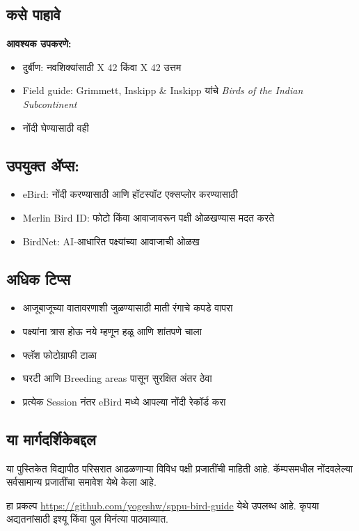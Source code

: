 \documentclass[a4paper,12pt,landscape]{memoir}
\newcommand{\introsection}[2]{%
  \begin{minipage}[t]{0.48\textwidth}
    \begin{mdframed}[
      linecolor=headingcolor,
      linewidth=1pt,
      roundcorner=5pt,
      leftmargin=0pt,
      rightmargin=0pt,
      backgroundcolor=headingcolor!5
    ]
      #1
    \end{mdframed}
  \end{minipage}\hfill
  \begin{minipage}[t]{0.48\textwidth}
    \begin{mdframed}[
      linecolor=headingcolor,
      linewidth=1pt,
      roundcorner=5pt,
      leftmargin=0pt,
      rightmargin=0pt,
      backgroundcolor=headingcolor!5
    ]
      #2
    \end{mdframed}
  \end{minipage}
  \newpage
}
\begin{document}
\introsection{%
  \section*{\textbf{कसे पाहावे}}
  \textbf{आवश्यक उपकरणे:}
  \begin{itemize}
  \item दुर्बीण: नवशिक्यांसाठी {\latintext 8 X 42} किंवा {\latintext 10 X 42} उत्तम
  \item {\latintext Field guide: Grimmett, Inskipp \& Inskipp} यांचे {\latintext \textit{Birds of the Indian Subcontinent}}
  \item नोंदी घेण्यासाठी वही
  \end{itemize}
}{%
  \section*{\textbf{उपयुक्त ॲप्स:}}
  \begin{itemize}
  \item {\latintext eBird}: नोंदी करण्यासाठी आणि हॉटस्पॉट एक्सप्लोर करण्यासाठी
  \item {\latintext Merlin Bird ID}: फोटो किंवा आवाजावरून पक्षी ओळखण्यास मदत करते
  \item {\latintext BirdNet}: {\latintext AI}-आधारित पक्ष्यांच्या आवाजाची ओळख
  \end{itemize}
}

\introsection{%
  \section*{\textbf{अधिक टिप्स}}
  \begin{itemize}
  \item आजूबाजूच्या वातावरणाशी जुळण्यासाठी माती रंगाचे कपडे वापरा
  \item पक्ष्यांना त्रास होऊ नये म्हणून हळू आणि शांतपणे चाला
  \item फ्लॅश फोटोग्राफी टाळा
  \item घरटी आणि {\latintext Breeding areas} पासून सुरक्षित अंतर ठेवा
  \item प्रत्येक {\latintext Session} नंतर {\latintext eBird} मध्ये आपल्या नोंदी रेकॉर्ड करा
  \end{itemize}
}{%
  \section*{\textbf{या मार्गदर्शिकेबद्दल}}
  या पुस्तिकेत विद्यापीठ परिसरात आढळणाऱ्या विविध पक्षी प्रजातींची माहिती आहे. कॅम्पसमधील नोंदवलेल्या सर्वसामान्य प्रजातींचा समावेश येथे केला आहे.
  \par\medskip
  हा प्रकल्प  {\latintext\href{https://github.com/yogeshw/sppu-bird-guide}{https://github.com/yogeshw/sppu-bird-guide}} येथे उपलब्ध आहे. कृपया अद्यतनांसाठी इश्यू किंवा पुल विनंत्या पाठवाव्यात.
}
\end{document}

